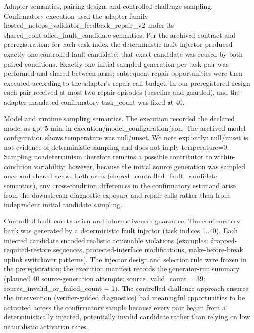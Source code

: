 \documentclass[conference]{IEEEtran}
\begin{document}
Adapter semantics, pairing design, and controlled-challenge sampling. Confirmatory execution used the adapter family hosted\_netops\_validator\_feedback\_repair\_v2 under its shared\_controlled\_fault\_candidate semantics. Per the archived contract and preregistration: for each task index the deterministic fault injector produced exactly one controlled-fault candidate; that exact candidate was reused by both paired conditions. Exactly one initial sampled generation per task pair was performed and shared between arms; subsequent repair opportunities were then executed according to the adapter's repair-call budget. In our preregistered design each pair received at most two repair episodes (baseline and guarded), and the adapter-mandated confirmatory task\_count was fixed at 40.

Model and runtime sampling semantics. The execution recorded the declared model as gpt-5-mini in execution/model\_configuration.json. The archived model configuration shows temperature was null/unset. We note explicitly: null/unset is not evidence of deterministic sampling and does not imply temperature=0. Sampling nondeterminism therefore remains a possible contributor to within-condition variability; however, because the initial source generation was sampled once and shared across both arms (shared\_controlled\_fault\_candidate semantics), any cross-condition differences in the confirmatory estimand arise from the downstream diagnostic exposure and repair calls rather than from independent initial candidate sampling.

Controlled-fault construction and informativeness guarantee. The confirmatory bank was generated by a deterministic fault injector (task indices 1..40). Each injected candidate encoded realistic actionable violations (examples: dropped-required-restore sequences, protected-interface modifications, make-before-break uplink switchover patterns). The injector design and selection rule were frozen in the preregistration; the execution manifest records the generator-run summary (planned 40 source-generation attempts; source\_valid\_count = 39; source\_invalid\_or\_failed\_count = 1). The controlled-challenge approach ensures the intervention (verifier-guided diagnostics) had meaningful opportunities to be activated across the confirmatory sample because every pair began from a deterministically injected, potentially invalid candidate rather than relying on low naturalistic activation rates.
\end{document}
